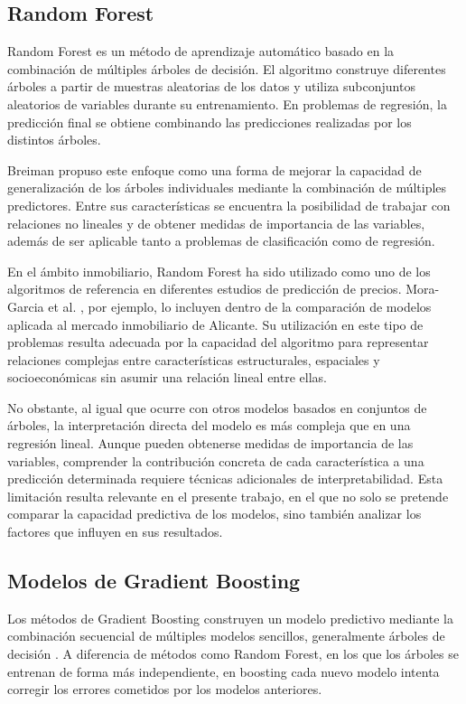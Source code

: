\documentclass[IB]{TFUOC}%
\begin{document}
\subsection{Random Forest}

Random Forest es un método de aprendizaje automático basado en la combinación de múltiples árboles de decisión. El algoritmo construye diferentes árboles a partir de muestras aleatorias de los datos y utiliza subconjuntos aleatorios de variables durante su entrenamiento. En problemas de regresión, la predicción final se obtiene combinando las predicciones realizadas por los distintos árboles.

Breiman \cite{breiman2001randomforest} propuso este enfoque como una forma de mejorar la capacidad de generalización de los árboles individuales mediante la combinación de múltiples predictores. Entre sus características se encuentra la posibilidad de trabajar con relaciones no lineales y de obtener medidas de importancia de las variables, además de ser aplicable tanto a problemas de clasificación como de regresión.

En el ámbito inmobiliario, Random Forest ha sido utilizado como uno de los algoritmos de referencia en diferentes estudios de predicción de precios. Mora-Garcia et al. \cite{moragarcia2022housing}, por ejemplo, lo incluyen dentro de la comparación de modelos aplicada al mercado inmobiliario de Alicante. Su utilización en este tipo de problemas resulta adecuada por la capacidad del algoritmo para representar relaciones complejas entre características estructurales, espaciales y socioeconómicas sin asumir una relación lineal entre ellas.

No obstante, al igual que ocurre con otros modelos basados en conjuntos de árboles, la interpretación directa del modelo es más compleja que en una regresión lineal. Aunque pueden obtenerse medidas de importancia de las variables, comprender la contribución concreta de cada característica a una predicción determinada requiere técnicas adicionales de interpretabilidad. Esta limitación resulta relevante en el presente trabajo, en el que no solo se pretende comparar la capacidad predictiva de los modelos, sino también analizar los factores que influyen en sus resultados.

\subsection{Modelos de Gradient Boosting}

Los métodos de Gradient Boosting construyen un modelo predictivo mediante la combinación secuencial de múltiples modelos sencillos, generalmente árboles de decisión \cite{friedman2001gradient}. A diferencia de métodos como Random Forest, en los que los árboles se entrenan de forma más independiente, en boosting cada nuevo modelo intenta corregir los errores cometidos por los modelos anteriores.
\end{document}
